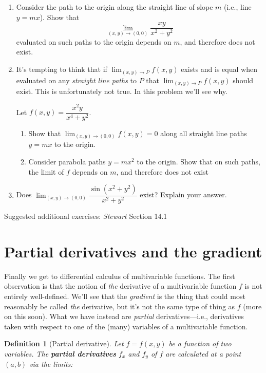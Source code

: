 \documentclass[12pt]{article}
\numberwithin{equation}{subsection}
\numberwithin{figure}{subsection}
\newtheorem{defn}[subsection]{Definition}
\theoremstyle{note}
\begin{document}
{\begin{enumerate}[label=\arabic*.]
\item Consider the path to the origin along the straight line of slope $m$ (i.e., line $y=mx$). Show that \[ \lim_{(x,y)\to(0,0) }\dfrac{xy}{x^2+y^2}\] evaluated on such paths to the origin depends on $m$, and therefore does not exist.

\item It's tempting to think that if $\lim_{(x,y)\to P}f(x,y)$ exists and is equal when evaluated on any \textit{straight line paths} to $P$ that $\lim_{(x,y)\to P}f(x,y)$ should exist. This is unfortunately not true. In this problem we'll see why. 

Let $f(x,y)=\dfrac{x^2y}{x^4+y^2}$. 
\begin{enumerate}
	\item Show that $\displaystyle \lim_{(x,y)\to (0,0)}f(x,y)=0$ along all straight line paths $y=mx$ to the origin. 
	\item Consider parabola paths $y=mx^2$ to the origin. Show that on such paths, the limit of $f$ depends on $m$, and therefore does not exist
\end{enumerate}

\item Does $\displaystyle \lim_{(x,y)\to (0,0)} \dfrac{\sin(x^2+y^2)}{x^2+y^2}$ exist? Explain your answer.
\end{enumerate}



Suggested additional exercises: \textit{Stewart} Section 14.1


\section{Partial derivatives and the gradient}

Finally we get to differential calculus of multivariable functions. The first observation is that the notion of \textit{the} derivative of a multivariable function $f$ is not entirely well-defined. We'll see that the \textit{gradient} is the thing that could most reasonably be called \textit{the} derivative, but it's not the same type of thing as $f$ (more on this soon). What we have instead are \textit{partial} derivatives---i.e., derivatives taken with respect to one of the (many) variables of a multivariable function. 


\begin{defn}[Partial derivative] Let $f=f(x,y)$ be a function of two variables. The \textbf{partial derivatives} $f_x$ and $f_y$ of $f$ are calculated at a point $(a,b)$ via the limits:


\end{defn}}
\end{document}

